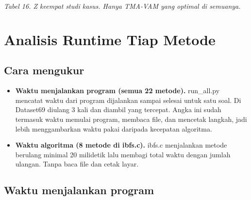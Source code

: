 \documentclass[10pt,a4paper]{article}
\begin{document}
\emph{Tabel 16. Z keempat studi kasus. Hanya TMA-VAM yang optimal di
semuanya.}

\section{Analisis Runtime Tiap Metode}\label{runtime-tiap-metode}

\subsection{Cara mengukur}\label{cara-mengukur}

\begin{itemize}
\item
  \textbf{Waktu menjalankan program (semua 22 metode).} run\_all.py
  mencatat waktu dari program dijalankan sampai selesai untuk satu soal.
  Di Dataset69 diulang 3 kali dan diambil yang tercepat. Angka ini sudah
  termasuk waktu memulai program, membaca file, dan mencetak langkah,
  jadi lebih menggambarkan waktu pakai daripada kecepatan algoritma.
\item
  \textbf{Waktu algoritma (8 metode di ibfs.c).} ibfs.c menjalankan
  metode berulang minimal 20 milidetik lalu membagi total waktu dengan
  jumlah ulangan. Tanpa baca file dan cetak layar.
\end{itemize}

\subsection{Waktu menjalankan
program}\label{waktu-menjalankan-program}
\end{document}
